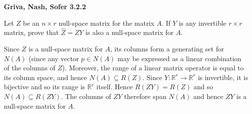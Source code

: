 \textbf{Griva, Nash, Sofer 3.2.2}

Let $Z$ be an $n \times r$ null-space matrix for the matrix $A$. If $Y$ is any invertible $r \times r$ matrix, prove
that $\hat{Z} = ZY$ is also a null-space matrix for $A$.

\begin{solution}
  Since $Z$ is a null-space matrix for $A$, its columns form a generating set for $N(A)$ (since any vector $p \in N(A)$
  may be expressed as a linear combination of the columns of $Z$). Moreover, the range of a linear matrix operator is 
  equal to its column space, and hence $N(A) \subseteq R(Z)$. Since $Y:\mathbb{R}^r \to \mathbb{R}^r$ is invertible, 
  it is bijective and so its range is $\mathbb{R}^r$ itself. Hence $R(ZY) = R(Z)$ and so $N(A) \subseteq R(ZY)$. The 
  columns of $ZY$ therefore span $N(A)$ and hence $ZY$ is a null-space matrix for $A$.
  \ \\
\end{solution}
